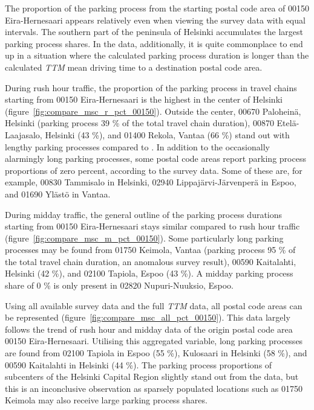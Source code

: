The proportion of the parking process from the starting postal code area of 00150 Eira-Hernesaari appears relatively even when viewing the survey data with equal intervals. The southern part of the peninsula of Helsinki accumulates the largest parking process shares. In the  data, additionally, it is quite commonplace to end up in a situation where the calculated parking process duration is longer than the calculated \textit{TTM} mean driving time to a destination postal code area.

During rush hour traffic, the proportion of the parking process in travel chains starting from 00150 Eira-Hernesaari is the highest in the center of Helsinki (figure~\ref{fig:compare_msc_r_pct_00150}). Outside the center, 00670 Paloheinä, Helsinki (parking process 39 \% of the total travel chain duration), 00870 Etelä-Laajasalo, Helsinki (43 \%), and 01400 Rekola, Vantaa (66 \%) stand out with lengthy parking processes compared to . In addition to the occasionally alarmingly long parking processes, some postal code areas report parking process proportions of zero percent, according to the survey data. Some of these are, for example, 00830 Tammisalo in Helsinki, 02940 Lippajärvi-Järvenperä in Espoo, and 01690 Ylästö in Vantaa.

During midday traffic, the general outline of the parking process durations starting from 00150 Eira-Hernesaari stays similar compared to rush hour traffic (figure~\ref{fig:compare_msc_m_pct_00150}). Some particularly long parking processes may be found from 01750 Keimola, Vantaa (parking process 95 \% of the total travel chain duration, an anomalous survey result), 00590 Kaitalahti, Helsinki (42 \%), and 02100 Tapiola, Espoo (43 \%). A midday parking process share of 0 \% is only present in 02820 Nupuri-Nuuksio, Espoo.

Using all available survey data and the full \textit{TTM} data, all postal code areas can be represented (figure~\ref{fig:compare_msc_all_pct_00150}). This data largely follows the trend of rush hour and midday data of the origin postal code area 00150 Eira-Hernesaari. Utilising this aggregated variable, long parking processes are found from 02100 Tapiola in Espoo (55 \%), Kulosaari in Helsinki (58 \%), and 00590 Kaitalahti in Helsinki (44 \%). The parking process proportions of subcenters of the Helsinki Capital Region slightly stand out from the data, but this is an inconclusive observation as sparsely populated locations such as 01750 Keimola may also receive large parking process shares.

